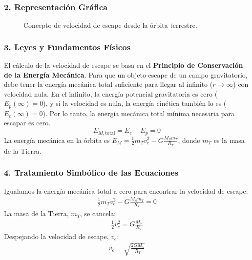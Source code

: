 \subsubsection*{2. Representación Gráfica}
\begin{figure}[H]
    \centering
    \caption{Concepto de velocidad de escape desde la órbita terrestre.}
\end{figure}

\subsubsection*{3. Leyes y Fundamentos Físicos}
El cálculo de la velocidad de escape se basa en el \textbf{Principio de Conservación de la Energía Mecánica}.
Para que un objeto escape de un campo gravitatorio, debe tener la energía mecánica total suficiente para llegar al infinito ($r \to \infty$) con velocidad nula. En el infinito, la energía potencial gravitatoria es cero ($E_p(\infty) = 0$), y si la velocidad es nula, la energía cinética también lo es ($E_c(\infty)=0$). Por lo tanto, la energía mecánica total mínima necesaria para escapar es cero.
$$ E_{M, \text{total}} = E_c + E_p = 0 $$
La energía mecánica en la órbita es $E_M = \frac{1}{2}m_T v_e^2 - G\frac{M_S m_T}{R_T}$, donde $m_T$ es la masa de la Tierra.

\subsubsection*{4. Tratamiento Simbólico de las Ecuaciones}
Igualamos la energía mecánica total a cero para encontrar la velocidad de escape:
\begin{gather}
    \frac{1}{2}m_T v_e^2 - G\frac{M_S m_T}{R_T} = 0
\end{gather}
La masa de la Tierra, $m_T$, se cancela:
\begin{gather}
    \frac{1}{2}v_e^2 = G\frac{M_S}{R_T}
\end{gather}
Despejando la velocidad de escape, $v_e$:
\begin{gather}
    v_e = \sqrt{\frac{2 G M_S}{R_T}}
\end{gather}

